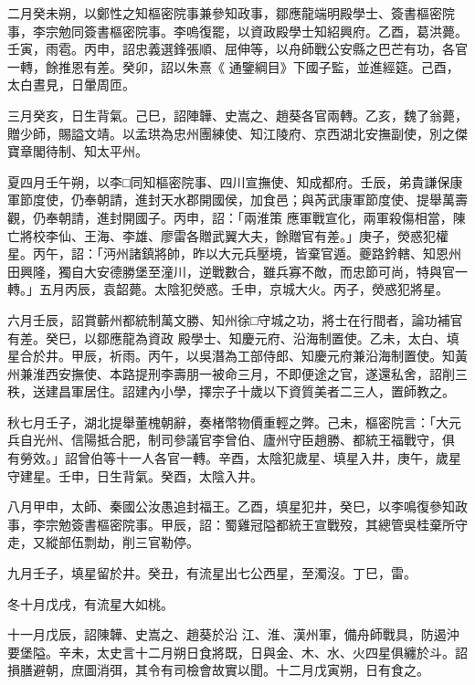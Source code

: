 \begin{pinyinscope}
 二月癸未朔，以鄭性之知樞密院事兼參知政事，鄒應龍端明殿學士、簽書樞密院事，李宗勉同簽書樞密院事。李嗚復罷，以資政殿學士知紹興府。乙酉，葛洪薨。壬寅，雨雹。丙申，詔忠義選鋒張順、屈伸等，以舟師戰公安縣之巴芒有功，各官一轉，餘推恩有差。癸卯，詔以朱熹《
 通鑒綱目》下國子監，並進經筵。己酉，太白晝見，日暈周匝。



 三月癸亥，日生背氣。己巳，詔陣韡、史嵩之、趙葵各官兩轉。乙亥，魏了翁薨，贈少師，賜謚文靖。以孟珙為忠州團練使、知江陵府、京西湖北安撫副使，別之傑寶章閣待制、知太平州。



 夏四月壬午朔，以李□同知樞密院事、四川宣撫使、知成都府。壬辰，弟貴謙保康軍節度使，仍奉朝請，進封天水郡開國侯，加食邑；與芮武康軍節度使、提舉萬壽觀，仍奉朝請，進封開國子。丙申，詔：「兩淮策
 應軍戰宣化，兩軍殺傷相當，陳亡將校李仙、王海、李雄、廖雷各贈武翼大夫，餘贈官有差。」庚子，熒惑犯權星。丙午，詔：「沔州諸鎮將帥，昨以大元兵壓境，皆棄官遁。夔路鈐轄、知恩州田興隆，獨自大安德勝堡至潼川，逆戰數合，雖兵寡不敵，而忠節可尚，特與官一轉。」五月丙辰，袁韶薨。太陰犯熒惑。壬申，京城大火。丙子，熒惑犯將星。



 六月壬辰，詔賞蘄州都統制萬文勝、知州徐□守城之功，將士在行間者，論功補官有差。癸巳，以鄒應龍為資政
 殿學士、知慶元府、沿海制置使。乙未，太白、填星合於井。甲辰，祈雨。丙午，以吳潛為工部侍郎、知慶元府兼沿海制置使。知黃州兼淮西安撫使、本路提刑李壽朋一被命三月，不即便途之官，遂還私舍，詔削三秩，送建昌軍居住。詔建內小學，擇宗子十歲以下資質美者二三人，置師教之。



 秋七月壬子，湖北提舉董槐朝辭，奏楮幣物價重輕之弊。己未，樞密院言：「大元兵自光州、信陽抵合肥，制司參議官李曾伯、廬州守臣趙勝、都統王福戰守，俱
 有勞效。」詔曾伯等十一人各官一轉。辛酉，太陰犯歲星、填星入井，庚午，歲星守建星。壬申，日生背氣。癸酉，太陰入井。



 八月甲申，太師、秦國公汝愚追封福王。乙酉，填星犯井，癸巳，以李鳴復參知政事，李宗勉簽書樞密院事。甲辰，詔：蜀雞冠隘都統王宣戰歿，其總管吳桂棄所守走，又縱部伍剽劫，削三官勒停。



 九月壬子，填星留於井。癸丑，有流星出七公西星，至濁沒。丁巳，雷。



 冬十月戊戌，有流星大如桃。



 十一月戊辰，詔陳韡、史嵩之、趙葵於沿
 江、淮、漢州軍，備舟師戰具，防遏沖要堡隘。辛未，太史言十二月朔日食將既，日與金、木、水、火四星俱纏於斗。詔損膳避朝，庶圖消弭，其令有司檢會故實以聞。十二月戊寅朔，日有食之。




\end{pinyinscope}
